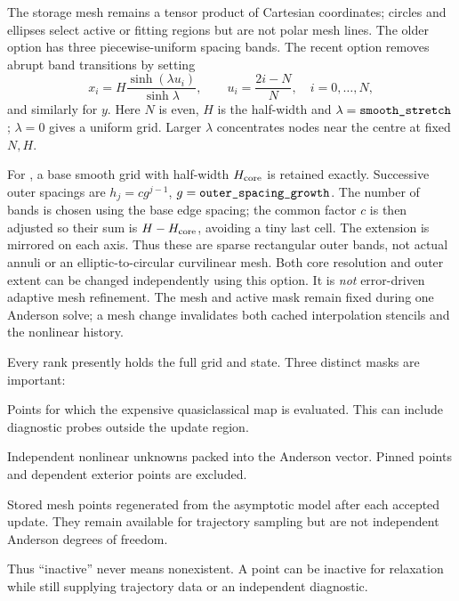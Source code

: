 \documentclass[11pt,a4paper]{article}
\newcommand{\code}[1]{\texttt{\detokenize{#1}}}
\begin{document}
The storage mesh remains a tensor product of Cartesian coordinates; circles
and ellipses select active or fitting regions but are not polar mesh lines.
The older \code{multiscale} option has three piecewise-uniform spacing bands.
The recent \code{smooth} option removes abrupt band transitions by setting
\begin{equation}
 x_i=H\frac{\sinh(\lambda u_i)}{\sinh\lambda},\qquad
 u_i=\frac{2i-N}{N},\quad i=0,\ldots,N,
 \label{eq:smoothmesh}
\end{equation}
and similarly for $y$. Here $N$ is even, $H$ is the half-width and
$\lambda=\code{smooth_stretch}$; $\lambda=0$ gives a uniform grid.
Larger $\lambda$ concentrates nodes near the centre at fixed $N,H$.

For \code{extended_smooth}, a base smooth grid with half-width
$H_{\rm core}$ is retained exactly. Successive outer spacings are
$h_j=cg^{j-1}$, $g=\code{outer_spacing_growth}$. The number of bands is
chosen using the base edge spacing; the common factor $c$ is then adjusted
so their sum is $H-H_{\rm core}$, avoiding a tiny last cell. The extension
is mirrored on each axis. Thus these are sparse rectangular outer bands,
not actual annuli or an elliptic-to-circular curvilinear mesh. Both core
resolution and outer extent can be changed independently using this option.
It is \emph{not} error-driven adaptive mesh refinement.  The mesh and active
mask remain fixed during one Anderson solve; a mesh change invalidates both
cached interpolation stencils and the nonlinear history.

Every rank presently holds the full grid and state.  Three distinct masks are
important:
\begin{description}[leftmargin=29mm,style=nextline]
  \item[Mapped targets] Points for which the expensive quasiclassical map is
  evaluated.  This can include diagnostic probes outside the update region.
  \item[Update points] Independent nonlinear unknowns packed into the
  Anderson vector.  Pinned points and dependent exterior points are excluded.
  \item[Dependent halo] Stored mesh points regenerated from the asymptotic
  model after each accepted update.  They remain available for trajectory
  sampling but are not independent Anderson degrees of freedom.
\end{description}
Thus ``inactive'' never means nonexistent.  A point can be inactive for
relaxation while still supplying trajectory data or an independent diagnostic.
\end{document}
